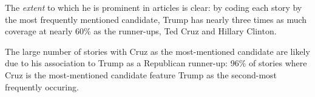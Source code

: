 \documentclass[letterpaper]{article}
\begin{document}
The \emph{extent} to which he is prominent in articles is clear: by coding each story by the most frequently mentioned candidate, Trump has nearly three times as much coverage at nearly 60\% as the runner-ups, Ted Cruz and Hillary Clinton.

The large number of stories with Cruz as the most-mentioned candidate are likely due to his association to Trump as a Republican runner-up: 96\% of stories where Cruz is the most-mentioned candidate feature Trump as the second-most frequently occuring.
 





 
\end{document}
